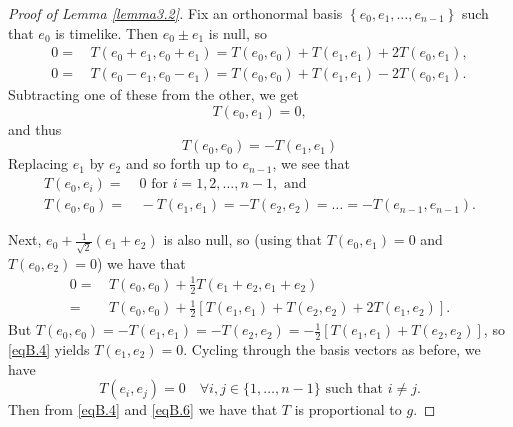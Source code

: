 \documentclass[12pt]{amsart}
\numberwithin{equation}{section}
\begin{document}
\begin{proof}[Proof of Lemma \ref{lemma3.2}]
Fix an orthonormal basis $\left \{ e_0,e_1,\dots,e_{n-1}\right \}$ such that $e_0$ is timelike. Then $e_0\pm e_1$ is null, so
\begin{equation}
\label{eqB.1}
\begin{split}
0=&\, T(e_0+e_1,e_0+e_1)= T(e_0,e_0)+T(e_1,e_1)+2T(e_0,e_1),\\
0=&\, T(e_0-e_1,e_0-e_1)= T(e_0,e_0)+T(e_1,e_1)-2T(e_0,e_1).
\end{split}
\end{equation}
Subtracting one of these from the other, we get
\begin{equation}
\label{eqB.2}
T(e_0,e_1)=0,
\end{equation}
and thus
\begin{equation}
\label{eqB.3}
T(e_0,e_0)=-T(e_1,e_1)
\end{equation}
Replacing $e_1$ by $e_2$ and so forth up to $e_{n-1}$, we see that
\begin{equation}
\label{eqB.4}
\begin{split}
T(e_0,e_i)=&\, 0\text{ for }i=1,2,\dots,n-1,\text{ and }\\
T(e_0,e_0)=&\, -T(e_1,e_1)=-T(e_2,e_2)=\dots=-T(e_{n-1},e_{n-1}).
\end{split}
\end{equation}

Next, $e_0+\frac{1}{\sqrt{2}}\left ( e_1+e_2\right )$ is also null, so (using that $T(e_0,e_1)=0$ and $T(e_0,e_2)=0$) we have that
\begin{equation}
\label{eqB.5}
\begin{split}
0=&\, T(e_0,e_0)+\frac12 T(e_1+e_2,e_1+e_2)\\
=&\, T(e_0,e_0)+\frac12 \left [T(e_1,e_1)+T(e_2,e_2) +2T(e_1,e_2) \right ].
\end{split}
\end{equation}
But $T(e_0,e_0)=-T(e_1,e_1)=-T(e_2,e_2)=-\frac12 \left [ T(e_1,e_1)+T(e_2,e_2)\right ]$, so \eqref{eqB.4} yields $T(e_1,e_2)=0$. Cycling through the basis vectors as before, we have
\begin{equation}
\label{eqB.6}
T(e_i,e_j)=0\quad \forall i,j\in \{ 1,\dots,n-1\}\text{ such that }i\neq j.
\end{equation}
Then from \eqref{eqB.4} and \eqref{eqB.6} we have that $T$ is proportional to $g$.
\end{proof}
\end{document}
